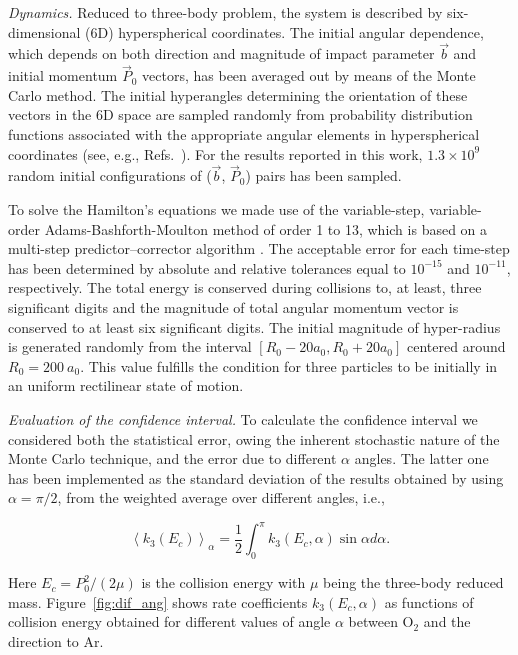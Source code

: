 \documentclass[aps,prl,twocolumn,showpacs,preprintnumbers,amsmath,amssymb,floatfix]{revtex4-2}
\begin{document}

{\it Dynamics.}
Reduced to three-body problem, the system is described by six-dimensional (6D) hyperspherical coordinates. The initial angular dependence, which depends on both direction and magnitude of impact parameter $\vec{b}$ and initial momentum $\vec{P}_0$ vectors, has been averaged out by means of the Monte Carlo method. The initial hyperangles determining the orientation of these vectors in the 6D space are sampled randomly from probability distribution functions associated with the appropriate angular elements in hyperspherical coordinates (see, e.g., Refs.~\cite{Perez-Rios2014,Perez-Rios2020}). For the results reported in this work, $1.3 \times 10^9$ random initial configurations of ($\vec{b}$, $\vec{P}_0$) pairs has been sampled.

To solve the Hamilton's equations we made use of the variable-step, variable-order Adams-Bashforth-Moulton method of order 1 to 13, which is based on a multi-step predictor–corrector algorithm \cite{Shampine1997,Ashino2000,Shampine2002}. 
The acceptable error for each time-step has been determined by absolute and relative tolerances equal to $10^{-15}$ and $10^{-11}$, respectively. The total energy is conserved during collisions to, at least, three significant digits and the magnitude of total angular momentum vector is conserved to at least six significant digits. The initial magnitude of hyper-radius is generated randomly from the interval $[R_0-20a_0, R_0+20a_0]$ centered around $R_0 = 200 ~ a_0$. This value fulfills the condition for three particles to be initially in an uniform rectilinear state of motion.

{\it Evaluation of the confidence interval.}
To calculate the confidence interval we considered both the statistical error, owing the inherent stochastic nature of the Monte Carlo technique, and the error due to different $\alpha$ angles. The latter one has been implemented as the standard deviation of the results obtained by using $\alpha=\pi/2$, from the weighted average over different angles, i.e., 

\begin{equation}
\left\langle k_3(E_c)\right\rangle_\alpha = \frac{1}{2} \int_{0}^{\pi}k_3(E_c,\alpha)\sin\alpha d\alpha .    
\end{equation}

\noindent
Here $E_c = P_0^2/(2\mu)$ is the collision energy with $\mu$ being the three-body reduced mass. Figure~\ref{fig:dif_ang} shows rate coefficients $k_3(E_c,\alpha)$ as functions of collision energy obtained for different values of angle $\alpha$ between O$_2$ and the direction to Ar.
\end{document}
